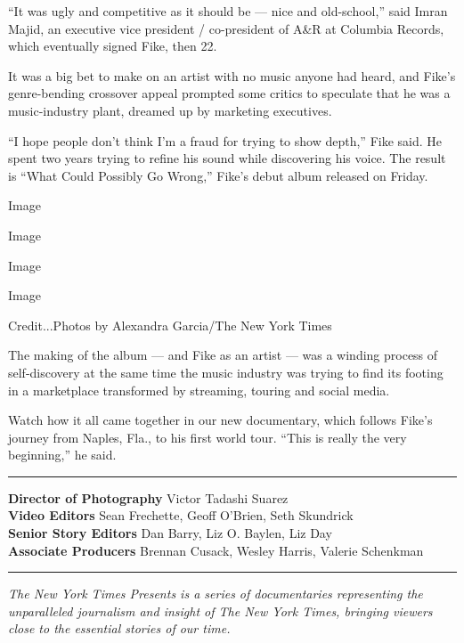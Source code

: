 ``It was ugly and competitive as it should be --- nice and old-school,''
said Imran Majid, an executive vice president / co-president of A\&R at
Columbia Records, which eventually signed Fike, then 22.

It was a big bet to make on an artist with no music anyone had heard,
and Fike's genre-bending crossover appeal prompted some critics to
speculate that he was a music-industry plant, dreamed up by marketing
executives.

``I hope people don't think I'm a fraud for trying to show depth,'' Fike
said. He spent two years trying to refine his sound while discovering
his voice. The result is ``What Could Possibly Go Wrong,'' Fike's debut
album released on Friday.

Image

Image

Image

Image

Credit...Photos by Alexandra Garcia/The New York Times

The making of the album --- and Fike as an artist --- was a winding
process of self-discovery at the same time the music industry was trying
to find its footing in a marketplace transformed by streaming, touring
and social media.

Watch how it all came together in our new documentary, which follows
Fike's journey from Naples, Fla., to his first world tour. ``This is
really the very beginning,'' he said.

\begin{center}\rule{0.5\linewidth}{\linethickness}\end{center}

\textbf{Director of Photography} Victor Tadashi Suarez\\
\textbf{Video Editors} Sean Frechette, Geoff O'Brien, Seth Skundrick\\
\textbf{Senior Story Editors} Dan Barry, Liz O. Baylen, Liz Day\\
\textbf{Associate Producers} Brennan Cusack, Wesley Harris, Valerie
Schenkman

\begin{center}\rule{0.5\linewidth}{\linethickness}\end{center}

\emph{The New York Times Presents is a series of documentaries
representing the unparalleled journalism and insight of The New York
Times, bringing viewers close to the essential stories of our time.}

